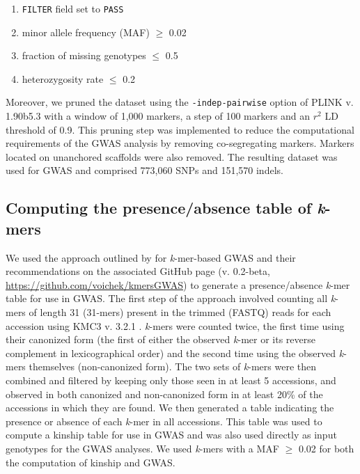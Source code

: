 \documentclass{article}
\begin{document}
\begin{enumerate}
	\item \texttt{FILTER} field set to \texttt{PASS}
	\item minor allele frequency (MAF) $\geq$ 0.02
	\item fraction of missing genotypes $\leq$ 0.5
	\item heterozygosity rate $\leq$ 0.2
\end{enumerate}

Moreover, we pruned the dataset using the \texttt{-\-indep-pairwise} option of
PLINK v. 1.90b5.3  with a window of 1,000 markers, a
step of 100 markers and an $r^2$ LD threshold of 0.9. This pruning step was
implemented to reduce the computational requirements of the GWAS analysis by
removing co-segregating markers. Markers located on unanchored scaffolds were
also removed. The resulting dataset was used for GWAS and comprised 773,060
SNPs and 151,570 indels.

\subsection*{Computing the presence/absence table of \emph{k}-mers}

We used the approach outlined by  for \emph{k}-mer-based GWAS
and their recommendations on the
associated GitHub page (v. 0.2-beta, \url{https://github.com/voichek/kmersGWAS}) to generate
a presence/absence \emph{k}-mer table for use in GWAS.  The first step of
the approach involved counting all \emph{k}-mers of length 31 (31-mers) present
in the trimmed (FASTQ) reads for each accession using KMC3 v. 3.2.1
. \emph{k}-mers were counted twice, the first time using their
canonized form (the first of either the observed \textit{k}-mer or its reverse
complement in lexicographical order) and the second time using the observed
\emph{k}-mers themselves (non-canonized form). The two sets of \textit{k}-mers
were then combined and filtered by
keeping only those seen in at least 5 accessions, and observed in both canonized
and non-canonized form in at least 20\% of the accessions in which they are found.
We then generated a table indicating the presence or absence of each
\emph{k}-mer in all accessions. This table was used to compute a kinship
table for use in GWAS and was also used directly as input genotypes for the
GWAS analyses. We used \emph{k}-mers with a MAF $\geq$ 0.02 for both the
computation of kinship and GWAS.
\end{document}
